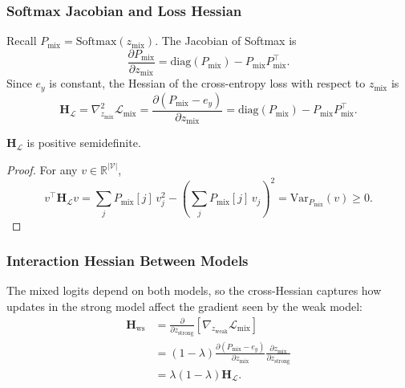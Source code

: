 \subsubsection{Softmax Jacobian and Loss Hessian}
Recall $P_{\mathrm{mix}} = \text{Softmax}(z_{\text{mix}})$. The Jacobian of Softmax is
\begin{equation}
    \frac{\partial P_{\mathrm{mix}}}{\partial z_{\text{mix}}} = \text{diag}(P_{\mathrm{mix}}) - P_{\mathrm{mix}} P_{\mathrm{mix}}^\top.
    \label{eq:appendix_softmax_jacobian}
\end{equation}
Since $e_y$ is constant, the Hessian of the cross-entropy loss with respect to $z_{\text{mix}}$ is
\begin{equation}
    \mathbf{H}_{\mathcal{L}} = \nabla^2_{z_{\text{mix}}}\mathcal{L}_{\mathrm{mix}}
    = \frac{\partial (P_{\mathrm{mix}}-e_y)}{\partial z_{\text{mix}}}
    = \text{diag}(P_{\mathrm{mix}}) - P_{\mathrm{mix}} P_{\mathrm{mix}}^\top.
    \label{eq:appendix_loss_hessian}
\end{equation}

\begin{lemma}
$\mathbf{H}_{\mathcal{L}}$ is positive semidefinite.
\end{lemma}
\begin{proof}
For any $v \in \mathbb{R}^{|\mathcal{V}|}$,
\begin{equation}
    v^\top \mathbf{H}_{\mathcal{L}} v
    = \sum_{j} P_{\mathrm{mix}}[j]\, v_j^2 - \left(\sum_j P_{\mathrm{mix}}[j]\, v_j\right)^2
    = \mathrm{Var}_{P_{\mathrm{mix}}}(v) \ge 0.
    \label{eq:appendix_hessian_psd}
\end{equation}
\end{proof}

\subsubsection{Interaction Hessian Between Models}
The mixed logits depend on both models, so the cross-Hessian captures how updates in the strong model affect the gradient seen by the weak model:
\begin{align}
    \mathbf{H}_{\mathrm{ws}}
    &= \frac{\partial}{\partial z_{\mathrm{strong}}}\left[\nabla_{z_{\mathrm{weak}}}\mathcal{L}_{\mathrm{mix}}\right] \nonumber\\
    &= (1-\lambda)\frac{\partial (P_{\mathrm{mix}}-e_y)}{\partial z_{\text{mix}}}\frac{\partial z_{\text{mix}}}{\partial z_{\mathrm{strong}}} \nonumber\\
    &= \lambda(1-\lambda)\mathbf{H}_{\mathcal{L}}.
    \label{eq:appendix_cross_hessian}
\end{align}

